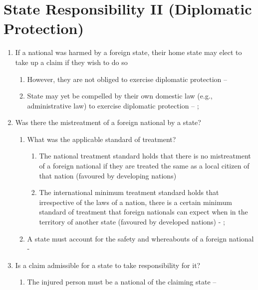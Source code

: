 \section{State Responsibility II (Diplomatic Protection)} 
\begin{enumerate}
    \item If a national was harmed by a foreign state, their home state may elect to take up a claim if they wish to do so
    \begin{enumerate}
        \item However, they are not obliged to exercise diplomatic protection -- 
        \item State may yet be compelled by their own domestic law (e.g., administrative law) to exercise diplomatic protection -- ; 
    \end{enumerate}
    \item Was there the mistreatment of a foreign national by a state?
    \begin{enumerate}
        \item What was the applicable standard of treatment?
        \begin{enumerate}
            \item The national treatment standard holds that there is no mistreatment of a foreign national if they are treated the same as a local citizen of that nation (favoured by developing nations)
            \item The international minimum treatment standard holds that irrespective of the laws of a nation, there is a certain minimum standard of treatment that foreign nationals can expect when in the territory of another state (favoured by developed nations) - ; 
        \end{enumerate}
        \item A state must account for the safety and whereabouts of a foreign national - 
    \end{enumerate}
    \item Is a claim admissible for a state to take responsibility for it?
    \begin{enumerate}
        \item The injured person must be a national of the claiming state -- 

\end{enumerate}
\end{enumerate}
